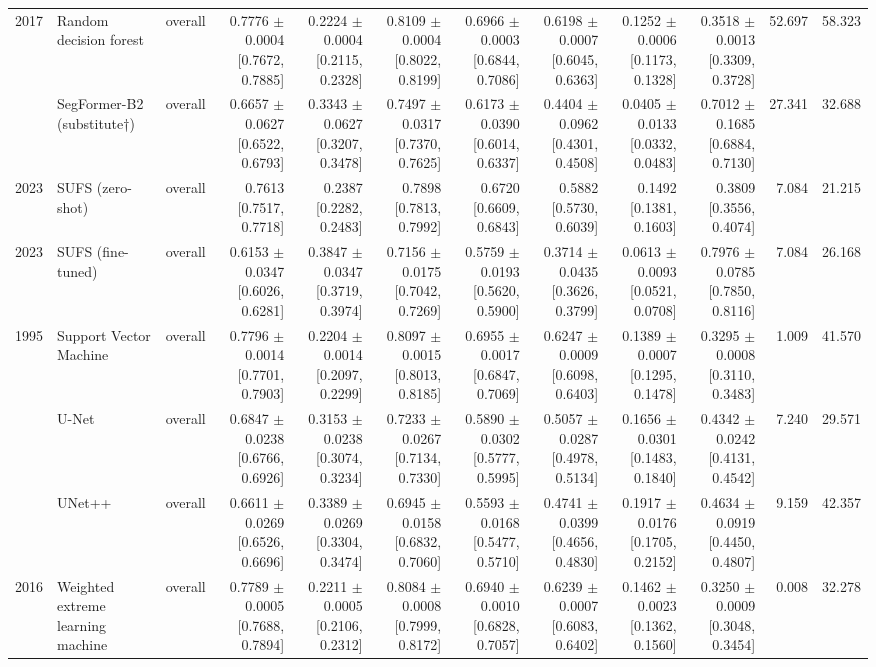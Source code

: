 \begin{table}[t]
\begin{tabular}{lllrrrrrrrrr}
2017 & Random decision forest & overall & 0.7776 $\pm$ 0.0004 [0.7672, 0.7885] & 0.2224 $\pm$ 0.0004 [0.2115, 0.2328] & 0.8109 $\pm$ 0.0004 [0.8022, 0.8199] & 0.6966 $\pm$ 0.0003 [0.6844, 0.7086] & 0.6198 $\pm$ 0.0007 [0.6045, 0.6363] & 0.1252 $\pm$ 0.0006 [0.1173, 0.1328] & 0.3518 $\pm$ 0.0013 [0.3309, 0.3728] & 52.697 & 58.323 \\
 & SegFormer-B2 (substitute†) & overall & 0.6657 $\pm$ 0.0627 [0.6522, 0.6793] & 0.3343 $\pm$ 0.0627 [0.3207, 0.3478] & 0.7497 $\pm$ 0.0317 [0.7370, 0.7625] & 0.6173 $\pm$ 0.0390 [0.6014, 0.6337] & 0.4404 $\pm$ 0.0962 [0.4301, 0.4508] & 0.0405 $\pm$ 0.0133 [0.0332, 0.0483] & 0.7012 $\pm$ 0.1685 [0.6884, 0.7130] & 27.341 & 32.688 \\
2023 & SUFS (zero-shot) & overall & 0.7613 [0.7517, 0.7718] & 0.2387 [0.2282, 0.2483] & 0.7898 [0.7813, 0.7992] & 0.6720 [0.6609, 0.6843] & 0.5882 [0.5730, 0.6039] & 0.1492 [0.1381, 0.1603] & 0.3809 [0.3556, 0.4074] & 7.084 & 21.215 \\
2023 & SUFS (fine-tuned) & overall & 0.6153 $\pm$ 0.0347 [0.6026, 0.6281] & 0.3847 $\pm$ 0.0347 [0.3719, 0.3974] & 0.7156 $\pm$ 0.0175 [0.7042, 0.7269] & 0.5759 $\pm$ 0.0193 [0.5620, 0.5900] & 0.3714 $\pm$ 0.0435 [0.3626, 0.3799] & 0.0613 $\pm$ 0.0093 [0.0521, 0.0708] & 0.7976 $\pm$ 0.0785 [0.7850, 0.8116] & 7.084 & 26.168 \\
1995 & Support Vector Machine & overall & 0.7796 $\pm$ 0.0014 [0.7701, 0.7903] & 0.2204 $\pm$ 0.0014 [0.2097, 0.2299] & 0.8097 $\pm$ 0.0015 [0.8013, 0.8185] & 0.6955 $\pm$ 0.0017 [0.6847, 0.7069] & 0.6247 $\pm$ 0.0009 [0.6098, 0.6403] & 0.1389 $\pm$ 0.0007 [0.1295, 0.1478] & 0.3295 $\pm$ 0.0008 [0.3110, 0.3483] & 1.009 & 41.570 \\
 & U-Net & overall & 0.6847 $\pm$ 0.0238 [0.6766, 0.6926] & 0.3153 $\pm$ 0.0238 [0.3074, 0.3234] & 0.7233 $\pm$ 0.0267 [0.7134, 0.7330] & 0.5890 $\pm$ 0.0302 [0.5777, 0.5995] & 0.5057 $\pm$ 0.0287 [0.4978, 0.5134] & 0.1656 $\pm$ 0.0301 [0.1483, 0.1840] & 0.4342 $\pm$ 0.0242 [0.4131, 0.4542] & 7.240 & 29.571 \\
 & UNet++ & overall & 0.6611 $\pm$ 0.0269 [0.6526, 0.6696] & 0.3389 $\pm$ 0.0269 [0.3304, 0.3474] & 0.6945 $\pm$ 0.0158 [0.6832, 0.7060] & 0.5593 $\pm$ 0.0168 [0.5477, 0.5710] & 0.4741 $\pm$ 0.0399 [0.4656, 0.4830] & 0.1917 $\pm$ 0.0176 [0.1705, 0.2152] & 0.4634 $\pm$ 0.0919 [0.4450, 0.4807] & 9.159 & 42.357 \\
2016 & Weighted extreme learning machine & overall & 0.7789 $\pm$ 0.0005 [0.7688, 0.7894] & 0.2211 $\pm$ 0.0005 [0.2106, 0.2312] & 0.8084 $\pm$ 0.0008 [0.7999, 0.8172] & 0.6940 $\pm$ 0.0010 [0.6828, 0.7057] & 0.6239 $\pm$ 0.0007 [0.6083, 0.6402] & 0.1462 $\pm$ 0.0023 [0.1362, 0.1560] & 0.3250 $\pm$ 0.0009 [0.3048, 0.3454] & 0.008 & 32.278 \\

\end{tabular}
\end{table}
